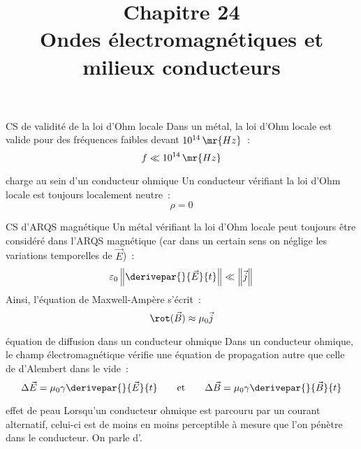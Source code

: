

\setcounter{chapitre}{24}

\title{\Large Chapitre 24 \\ \Huge Ondes électromagnétiques et milieux conducteurs}



\maketitle

\begin{proposition}{}{CS de validité de la loi d'Ohm locale}
    Dans un métal, la loi d'Ohm locale est valide pour des fréquences faibles devant $10^{14} \, \mr{Hz}$~:
    $$f \ll 10^{14}\, \mr{Hz} $$
\end{proposition}

\begin{theoreme}{}{charge au sein d'un conducteur ohmique}
    Un conducteur vérifiant la loi d'Ohm locale est toujours localement neutre~:
    $$\rho = 0$$
\end{theoreme}

\begin{theoreme}{}{CS d'ARQS magnétique}
    Un métal vérifiant la loi d'Ohm locale peut toujours être considéré dans l'ARQS magnétique (car dans un certain sens on néglige les variations temporelles de $\vec{E}$)~:
    $$\varepsilon_0 \left\Vert \derivepar{}{\vec{E}}{t}\right\Vert \ll \left\Vert\vec{j}\right\Vert $$
    Ainsi, l'équation de Maxwell-Ampère s'écrit~:
    $$\rot(\vec{B}) \approx \mu_0 \vec{j}$$
\end{theoreme}

\begin{theoreme}{}{équation de diffusion dans un conducteur ohmique}
    Dans un conducteur ohmique, le champ électromagnétique vérifie une équation de propagation autre que celle de d'Alembert dans le vide~:
    $$\Delta \vec{E} = \mu_0 \gamma \derivepar{}{\vec{E}}{t} \qquad \text{et} \qquad \Delta \vec{B} = \mu_0 \gamma \derivepar{}{\vec{B}}{t}$$
\end{theoreme}

\begin{proposition}{}{effet de peau}
    Lorsqu’un conducteur ohmique est parcouru par un courant alternatif,
    celui-ci est de moins en moins perceptible à mesure que l'on pénètre dans le conducteur. On parle d'.
\end{proposition}


